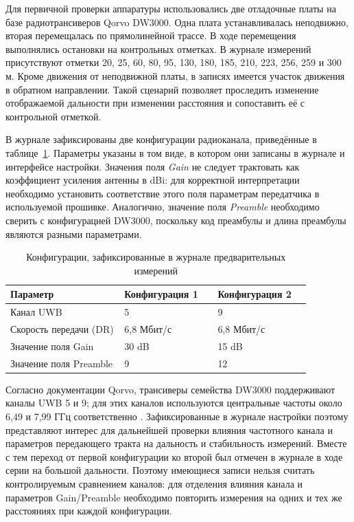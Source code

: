 \documentclass{misisarticle}
\begin{document}
Для первичной проверки аппаратуры использовались две отладочные платы на базе радиотрансиверов Qorvo DW3000. Одна плата устанавливалась неподвижно, вторая перемещалась по прямолинейной трассе. В ходе перемещения выполнялись остановки на контрольных отметках. В журнале измерений присутствуют отметки 20, 25, 60, 80, 95, 130, 180, 185, 210, 223, 256, 259 и 300 м. Кроме движения от неподвижной платы, в записях имеется участок движения в обратном направлении. Такой сценарий позволяет проследить изменение отображаемой дальности при изменении расстояния и сопоставить её с контрольной отметкой.

В журнале зафиксированы две конфигурации радиоканала, приведённые в таблице~\ref{tab:dw3000-config}. Параметры указаны в том виде, в котором они записаны в журнале и интерфейсе настройки. Значения поля \textit{Gain} не следует трактовать как коэффициент усиления антенны в dBi: для корректной интерпретации необходимо установить соответствие этого поля параметрам передатчика в используемой прошивке. Аналогично, значение поля \textit{Preamble} необходимо сверить с конфигурацией DW3000, поскольку код преамбулы и длина преамбулы являются разными параметрами.

\begin{table}[ht]
\centering
\caption{Конфигурации, зафиксированные в журнале предварительных измерений}
\label{tab:dw3000-config}
\begin{tabular}{|p{0.33\linewidth}|p{0.27\linewidth}|p{0.27\linewidth}|}
\hline
\textbf{Параметр} & \textbf{Конфигурация 1} & \textbf{Конфигурация 2} \\
\hline
Канал UWB & 5 & 9 \\
\hline
Скорость передачи (DR) & 6,8 Мбит/с & 6,8 Мбит/с \\
\hline
Значение поля Gain & 30 dB & 15 dB \\
\hline
Значение поля Preamble & 9 & 12 \\
\hline
\end{tabular}
\end{table}

Согласно документации Qorvo, трансиверы семейства DW3000 поддерживают каналы UWB 5 и 9; для этих каналов используются центральные частоты около 6,49 и 7,99 ГГц соответственно \cite{qorvo_dw3000}. Зафиксированные в журнале настройки поэтому представляют интерес для дальнейшей проверки влияния частотного канала и параметров передающего тракта на дальность и стабильность измерений. Вместе с тем переход от первой конфигурации ко второй был отмечен в журнале в ходе серии на большой дальности. Поэтому имеющиеся записи нельзя считать контролируемым сравнением каналов: для отделения влияния канала и параметров Gain/Preamble необходимо повторить измерения на одних и тех же расстояниях при каждой конфигурации.
\end{document}
